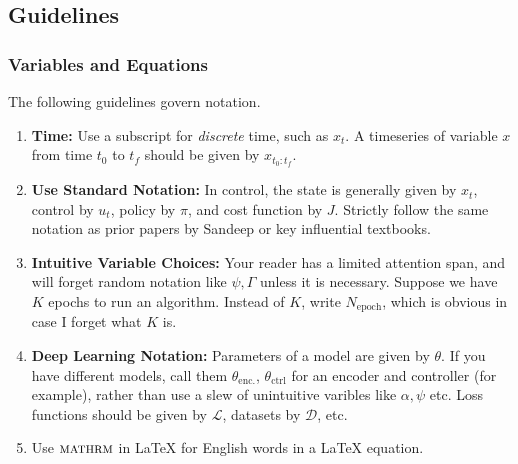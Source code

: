 

\subsection{Guidelines}

\subsubsection{Variables and Equations}

The following guidelines govern notation.

\begin{enumerate}
    \item \textbf{Time: } Use a subscript for \textit{discrete} time, such as $x_t$. A timeseries of variable $x$ from time $t_0$ to $t_f$ should be given by $x_{t_0:t_f}$.
    \item \textbf{Use Standard Notation: } In control, the state is generally given by $x_t$, control by $u_t$, policy by $\pi$, and cost function by $J$. Strictly follow the same notation as prior papers by Sandeep or key influential textbooks.
    \item \textbf{Intuitive Variable Choices: } Your reader has a limited attention span, and will forget random notation like $\psi, \Gamma$ unless it is necessary. Suppose we have $K$ epochs to run an algorithm. Instead of $K$, write $N_{\mathrm{epoch}}$, which is obvious in case I forget what $K$ is.
    \item \textbf{Deep Learning Notation: } Parameters of a model are given by $\theta$. If you have different models, call them $\theta_{\mathrm{enc.}}$, $\theta_{\mathrm{ctrl}}$ for an encoder and controller (for example), rather than use a slew of unintuitive varibles like $\alpha, \psi$ etc. Loss functions should be given by $\mathcal{L}$, datasets by $\mathcal{D}$, etc.
    \item Use $\textsc{mathrm}$ in LaTeX for English words in a LaTeX equation.
\end{enumerate}



